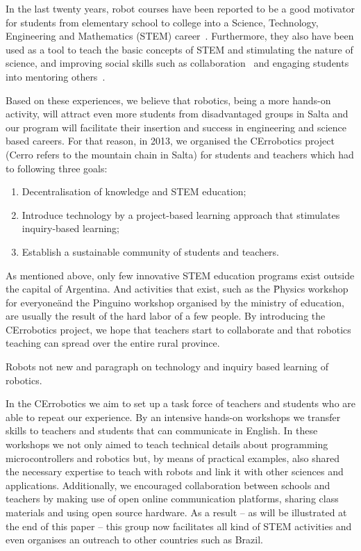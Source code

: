 \documentclass[a4paper]{llncs}
\begin{document}
In the last twenty years, robot courses have been reported to be a good motivator for students from elementary school to college into a Science, Technology, Engineering and Mathematics (STEM) career~\cite{RuizDelSolar2004,Rogers2004,Barak2009,wyffels2010,Nugent2010,wyffels2011,VanDyne2012,Karp2013}. Furthermore, they also have been used as a tool to teach the basic concepts of STEM and stimulating the nature of science\cite{Rogers2004,Barak2009,wyffels2010,Nugent2010,wyffels2011,Carbajal2011,VanDyne2012,Karp2013}, and improving social skills such as collaboration~\cite{Barak2009,Nugent2010,wyffels2010,wyffels2011} and engaging students into mentoring others~\cite{Karp2013}.

Based on these experiences, we believe that robotics, being a more hands-on activity, will attract even more students from disadvantaged groups in Salta and our program will facilitate their insertion and success in engineering and science based careers. For that reason, in 2013, we organised the CErrobotics project (Cerro refers to the mountain chain in Salta) for students and teachers which had to following three goals:
\begin{enumerate}
	\item Decentralisation of knowledge and STEM education;
	\item Introduce technology by a project-based learning approach that stimulates inquiry-based learning;
	\item Establish a sustainable community of students and teachers.
\end{enumerate}

As mentioned above, only few innovative STEM education programs exist outside the capital of Argentina. And activities that exist, such as the \"Physics workshop for everyone\" and the Pinguino workshop organised by the ministry of education, are usually the result of the hard labor of a few people. By introducing the CErrobotics project, we hope that teachers start to collaborate and that robotics teaching can spread over the entire rural province.

Robots not new and paragraph on technology and inquiry based learning of robotics.

In the CErrobotics we aim to set up a task force of teachers and students who are able to repeat our experience. By an intensive hands-on workshops we transfer skills to teachers and students that can communicate in English. In these workshops we not only aimed to teach technical details about programming microcontrollers and robotics but, by means of practical examples, also shared the necessary expertise to teach with robots and link it with other sciences and applications. Additionally, we encouraged collaboration between schools and teachers by making use of open online communication platforms, sharing class materials and using open source hardware. As a result -- as will be illustrated at the end of this paper --  this group now facilitates all kind of STEM activities and even organises an outreach to other countries such as Brazil.
\end{document}
